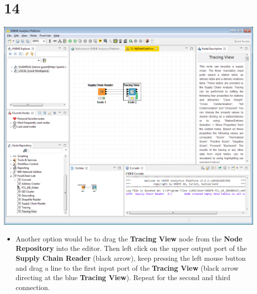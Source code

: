 \documentclass[10pt]{beamer}
\begin{document}
\section{14}
\begin{frame}
	\begin{center}
  		\includegraphics[height=0.6\textheight]{13.png}
	\end{center}
	\begin{itemize}
		\item Another option would be to drag the \textbf{Tracing View} node from the \textbf{Node Repository} into the editor. Then left click on the upper output port of the \textbf{Supply Chain Reader} (black arrow), keep pressing the left mouse button and drag a line to the first input port of the \textbf{Tracing View} (black arrow directing at the blue \textbf{Tracing View}). Repeat for the second and third connection.
	\end{itemize}
\end{frame}
\end{document}
